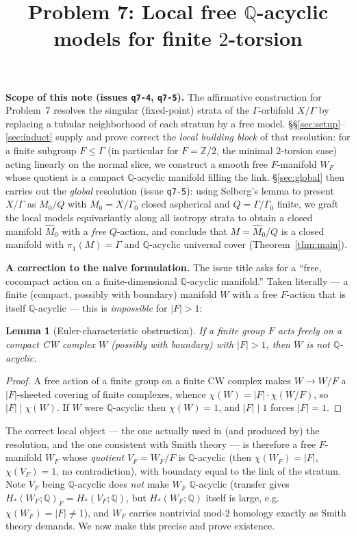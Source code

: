 \documentclass[12pt]{article}
\title{Problem 7: Local free $\mathbb{Q}$-acyclic models for finite $2$-torsion}
\author{}
\date{}
\newtheorem{lemma}[theorem]{Lemma}
\theoremstyle{definition}
\begin{document}
\maketitle

\noindent\textbf{Scope of this note (issues \texttt{q7-4}, \texttt{q7-5}).}
The affirmative construction for Problem~7 resolves the singular (fixed-point)
strata of the $\Gamma$-orbifold $X/\Gamma$ by replacing a tubular neighborhood
of each stratum by a free model. \S\S\ref{sec:setup}--\ref{sec:induct} supply and
prove correct the \emph{local building block} of that resolution: for a finite
subgroup $F\le\Gamma$ (in particular for $F=\mathbb{Z}/2$, the minimal
$2$-torsion case) acting linearly on the normal slice, we construct a smooth free
$F$-manifold $W_F$ whose quotient is a compact $\mathbb{Q}$-acyclic manifold
filling the link. \S\ref{sec:global} then carries out the \emph{global}
resolution (issue \texttt{q7-5}): using Selberg's lemma to present $X/\Gamma$ as
$M_0/Q$ with $M_0=X/\Gamma_0$ closed aspherical and $Q=\Gamma/\Gamma_0$ finite,
we graft the local models equivariantly along all isotropy strata to obtain a
closed manifold $\widehat M_0$ with a \emph{free} $Q$-action, and conclude that
$M=\widehat M_0/Q$ is a closed manifold with $\pi_1(M)=\Gamma$ and
$\mathbb{Q}$-acyclic universal cover (Theorem~\ref{thm:main}).

\medskip
\noindent\textbf{A correction to the naive formulation.}
The issue title asks for a ``free, cocompact action on a finite-dimensional
$\mathbb{Q}$-acyclic manifold.'' Taken literally --- a finite (compact, possibly
with boundary) manifold $W$ with a free $F$-action that is itself
$\mathbb{Q}$-acyclic --- this is \emph{impossible} for $|F|>1$:

\begin{lemma}[Euler-characteristic obstruction]\label{lem:euler}
If a finite group $F$ acts freely on a compact CW complex $W$ (possibly with
boundary) with $|F|>1$, then $W$ is not $\mathbb{Q}$-acyclic.
\end{lemma}
\begin{proof}
A free action of a finite group on a finite CW complex makes $W\to W/F$ a
$|F|$-sheeted covering of finite complexes, whence
$\chi(W)=|F|\cdot\chi(W/F)$, so $|F|\mid\chi(W)$. If $W$ were
$\mathbb{Q}$-acyclic then $\chi(W)=1$, and $|F|\mid 1$ forces $|F|=1$.
\end{proof}

The correct local object --- the one actually used in (and produced by) the
resolution, and the one consistent with Smith theory --- is therefore a free
$F$-manifold $W_F$ whose \emph{quotient} $V_F=W_F/F$ is $\mathbb{Q}$-acyclic
(then $\chi(W_F)=|F|$, $\chi(V_F)=1$, no contradiction), with boundary equal to
the link of the stratum. Note $V_F$ being $\mathbb{Q}$-acyclic does \emph{not}
make $W_F$ $\mathbb{Q}$-acyclic (transfer gives $H_*(W_F;\mathbb{Q})_F=
H_*(V_F;\mathbb{Q})$, but $H_*(W_F;\mathbb{Q})$ itself is large, e.g.\
$\chi(W_F)=|F|\neq1$), and $W_F$ carries nontrivial mod-$2$ homology exactly as
Smith theory demands. We now make this precise and prove existence.
\end{document}
